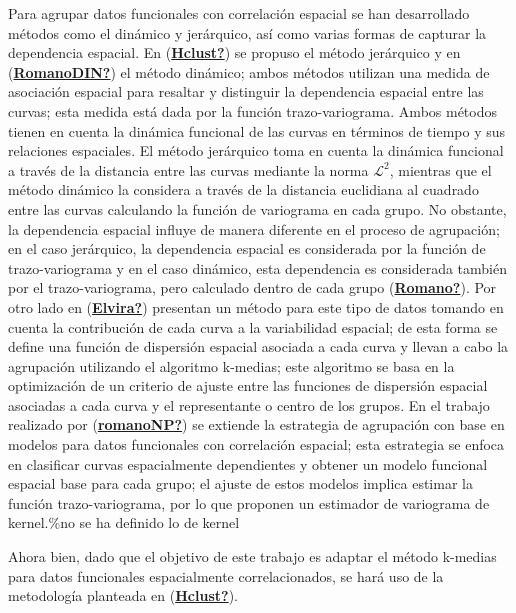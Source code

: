\documentclass[
]{book}
\begin{document}
Para agrupar datos funcionales con correlación espacial se han desarrollado métodos como el dinámico y jerárquico, así como varias formas de capturar la dependencia espacial. En (\protect\hyperlink{ref-Hclust}{\textbf{Hclust?}}) se propuso el método jerárquico y en (\protect\hyperlink{ref-RomanoDIN}{\textbf{RomanoDIN?}}) el método dinámico; ambos métodos utilizan una medida de asociación espacial para resaltar y distinguir la dependencia espacial entre las curvas; esta medida está dada por la función trazo-variograma. Ambos métodos tienen en cuenta la dinámica funcional de las curvas en términos de tiempo y sus relaciones espaciales. El método jerárquico toma en cuenta la dinámica funcional a través de la distancia entre las curvas mediante la norma \(\mathcal{L}^2\), mientras que el método dinámico la considera a través de la distancia euclidiana al cuadrado entre las curvas calculando la función de variograma en cada grupo. No obstante, la dependencia espacial influye de manera diferente en el proceso de agrupación; en el caso jerárquico, la dependencia espacial es considerada por la función de trazo-variograma y en el caso dinámico, esta dependencia es considerada también por el trazo-variograma, pero calculado dentro de cada grupo (\protect\hyperlink{ref-Romano}{\textbf{Romano?}}). Por otro lado en (\protect\hyperlink{ref-Elvira}{\textbf{Elvira?}}) presentan un método para este tipo de datos tomando en cuenta la contribución de cada curva a la variabilidad espacial; de esta forma se define una función de dispersión espacial asociada a cada curva y llevan a cabo la agrupación utilizando el algoritmo k-medias; este algoritmo se basa en la optimización de un criterio de ajuste entre las funciones de dispersión espacial asociadas a cada curva y el representante o centro de los grupos. En el trabajo realizado por (\protect\hyperlink{ref-romanoNP}{\textbf{romanoNP?}}) se extiende la estrategia de agrupación con base en modelos para datos funcionales con correlación espacial; esta estrategia se enfoca en clasificar curvas espacialmente dependientes y obtener un modelo funcional espacial base para cada grupo; el ajuste de estos modelos implica estimar la función trazo-variograma, por lo que proponen un estimador de variograma de kernel.\%no se ha definido lo de kernel

Ahora bien, dado que el objetivo de este trabajo es adaptar el método k-medias para datos funcionales espacialmente correlacionados, se hará uso de la metodología planteada en (\protect\hyperlink{ref-Hclust}{\textbf{Hclust?}}).
\end{document}
